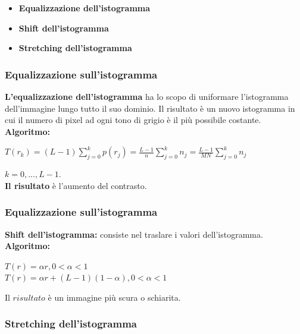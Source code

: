 \begin{itemize}
    \item \textbf{Equalizzazione dell’istogramma}
    \item \textbf{Shift dell’istogramma}
    \item \textbf{Stretching dell’istogramma}
\end{itemize}

\subsubsection{Equalizzazione sull'istogramma}

\textbf{L'equalizzazione dell’istogramma} ha lo scopo di uniformare l’istogramma dell’immagine lungo tutto il suo dominio. Il risultato
è un nuovo istogramma in cui il numero di pixel ad ogni tono di grigio è il più possibile costante.
\\\textbf{Algoritmo:}

\begin{center}
    $T(r_k) = (L-1)\sum_{j=0}^{k}p(r_j)=\frac{L-1}{n} \sum_{j=0}^{k}n_j = \frac{L-1}{MN}\sum_{j=0}^{k}n_j$
\end{center}

$k=0,...,L-1$.
\\\textbf{Il risultato} è l'aumento del contrasto.


\subsubsection{Equalizzazione sull'istogramma}

\textbf{Shift dell’istogramma:} consiste nel traslare i valori dell’istogramma.
\\\textbf{Algoritmo:}
\begin{center}
    $T(r) = \alpha r, 0 < \alpha < 1$
    \\
    $T(r) = \alpha r + (L-1)(1-\alpha), 0<\alpha<1$
\end{center}
Il $risultato$ è un immagine più scura o schiarita.


\subsubsection{Stretching dell’istogramma}


